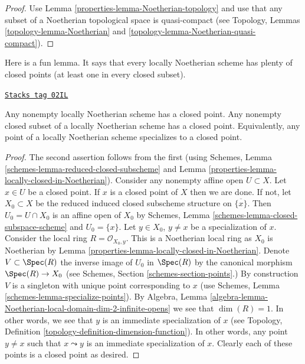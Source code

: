 \begin{proof}

Use Lemma \ref{properties-lemma-Noetherian-topology}
and use that any subset of a Noetherian topological
space is quasi-compact (see Topology,
Lemmas \ref{topology-lemma-Noetherian} and
\ref{topology-lemma-Noetherian-quasi-compact}).
\end{proof}

Here is a fun lemma.
It says that every locally Noetherian scheme has plenty of
closed points (at least one in every closed subset).

\begin{lemma}
\label{properties-lemma-locally-Noetherian-closed-point}
\href{https://stacks.math.columbia.edu/tag/02IL}{\texttt{Stacks tag 02IL}}

Any nonempty locally Noetherian scheme has a closed point.
Any nonempty closed subset of a locally Noetherian scheme has a closed point.
Equivalently, any point of a locally Noetherian scheme specializes
to a closed point.
\end{lemma}

\begin{proof}

The second assertion follows from the first (using
Schemes, Lemma \ref{schemes-lemma-reduced-closed-subscheme}
and Lemma \ref{properties-lemma-locally-closed-in-Noetherian}).
Consider any nonempty affine open $U \subset X$.
Let $x \in U$ be a closed point. If $x$ is a closed point
of $X$ then we are done. If not, let $X_0 \subset X$ be the
reduced induced closed subscheme structure on $\overline{\{x\}}$.
Then $U_0 = U \cap X_0$ is an affine open of $X_0$ by
Schemes, Lemma \ref{schemes-lemma-closed-subspace-scheme} and
$U_0 = \{x\}$. Let $y \in X_0$, $y \not = x$ be a specialization of $x$.
Consider the local ring $R = \mathcal{O}_{X_0, y}$.
This is a Noetherian local ring as $X_0$ is Noetherian
by Lemma \ref{properties-lemma-locally-closed-in-Noetherian}. Denote $V \subset \Spec(R)$
the inverse image of $U_0$ in $\Spec(R)$ by the canonical morphism
$\Spec(R) \to X_0$ (see Schemes, Section \ref{schemes-section-points}.)
By construction $V$ is a singleton with unique point corresponding to $x$ (use
Schemes, Lemma \ref{schemes-lemma-specialize-points}).
By
Algebra, Lemma \ref{algebra-lemma-Noetherian-local-domain-dim-2-infinite-opens}
we see that $\dim(R) = 1$.
In other words, we see that $y$ is an immediate specialization
of $x$ (see Topology, Definition \ref{topology-definition-dimension-function}).
In other words, any
point $y \not = x$ such that $x \leadsto y$ is an immediate
specialization of $x$. Clearly each of these points is a
closed point as desired.
\end{proof}

